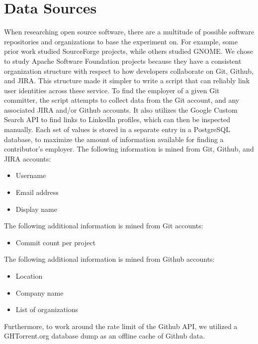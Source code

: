 \section{Data Sources}
When researching open source software, there are a multitude of possible software repositories and organizations to base the experiment on. For example, some prior work studied SourceForge projects, while others studied GNOME. We chose to study Apache Software Foundation projects because they have a consistent organization structure with respect to how developers collaborate on Git, Github, and JIRA. This structure made it simpler to write a script that can reliably link user identities across these service.
To find the employer of a given Git committer, the script attempts to collect data from the Git account, and any associated JIRA and/or Github accounts. It also utilizes the Google Custom Search API to find links to LinkedIn profiles, which can then be inspected manually. Each set of values is stored in a separate entry in a PostgreSQL database, to maximize the amount of information available for finding a contributor’s employer.
The following information is mined from Git, Github, and JIRA accounts:
\begin{itemize}
	\item Username
	\item Email address
	\item Display name
\end{itemize}
The following additional information is mined from Git accounts:
\begin{itemize}
	\item Commit count per project
\end{itemize}
The following additional information is mined from Github accounts:
\begin{itemize}
	\item Location
	\item Company name
	\item List of organizations
\end{itemize}
Furthermore, to work around the rate limit of the Github API, we utilized a GHTorrent.org database dump as an offline cache of Github data.

